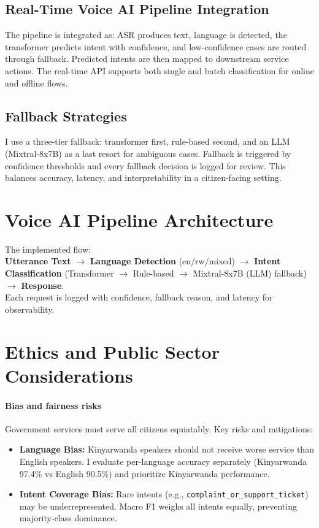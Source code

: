 \documentclass[11pt]{article}
\begin{document}
\subsection*{Real-Time Voice AI Pipeline Integration}

The pipeline is integrated as: ASR produces text, language is detected, the transformer predicts intent with confidence, and low-confidence cases are routed through fallback. Predicted intents are then mapped to downstream service actions. The real-time API supports both single and batch classification for online and offline flows.

\subsection*{Fallback Strategies}

I use a three-tier fallback: transformer first, rule-based second, and an LLM (Mixtral-8x7B) as a last resort for ambiguous cases. Fallback is triggered by confidence thresholds and every fallback decision is logged for review. This balances accuracy, latency, and interpretability in a citizen-facing setting.

\section*{Voice AI Pipeline Architecture}

The implemented flow: \\
\textbf{Utterance Text} $\rightarrow$ \textbf{Language Detection} (en/rw/mixed) $\rightarrow$ \textbf{Intent Classification} (Transformer $\rightarrow$ Rule-based $\rightarrow$ Mixtral-8x7B (LLM) fallback) $\rightarrow$ \textbf{Response}. \\
Each request is logged with confidence, fallback reason, and latency for observability.

\section*{Ethics and Public Sector Considerations}

\paragraph{Bias and fairness risks}
Government services must serve all citizens equiatably. Key risks and mitigations:
\begin{itemize}
  \item \textbf{Language Bias:} Kinyarwanda speakers should not receive worse service than English speakers. I evaluate per-language accuracy separately (Kinyarwanda 97.4\% vs English 90.5\%) and prioritize Kinyarwanda performance.
  \item \textbf{Intent Coverage Bias:} Rare intents (e.g., \texttt{complaint\_or\_support\_ticket}) may be underrepresented. Macro F1 weighs all intents equally, preventing majority-class dominance.
\end{itemize}
\end{document}
